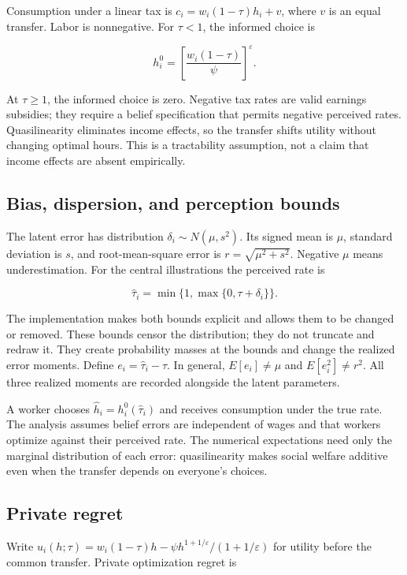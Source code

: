 \documentclass[
  11pt,
  letterpaper,
  DIV=11,
  numbers=noendperiod]{scrartcl}
\begin{document}
Consumption under a linear tax is \(c_i=w_i(1-\tau)h_i+v\), where \(v\)
is an equal transfer. Labor is nonnegative. For \(\tau<1\), the informed
choice is

\[h_i^0=\left[\frac{w_i(1-\tau)}{\psi}\right]^{\varepsilon}.\]

At \(\tau\geq1\), the informed choice is zero. Negative tax rates are
valid earnings subsidies; they require a belief specification that
permits negative perceived rates. Quasilinearity eliminates income
effects, so the transfer shifts utility without changing optimal hours.
This is a tractability assumption, not a claim that income effects are
absent empirically.

\subsection{Bias, dispersion, and perception
bounds}\label{bias-dispersion-and-perception-bounds}

The latent error has distribution \(\delta_i\sim N(\mu,s^2)\). Its
signed mean is \(\mu\), standard deviation is \(s\), and
root-mean-square error is \(r=\sqrt{\mu^2+s^2}\). Negative \(\mu\) means
underestimation. For the central illustrations the perceived rate is

\[\widehat\tau_i=\min\{1,\max\{0,\tau+\delta_i\}\}.\]

The implementation makes both bounds explicit and allows them to be
changed or removed. These bounds censor the distribution; they do not
truncate and redraw it. They create probability masses at the bounds and
change the realized error moments. Define \(e_i=\widehat\tau_i-\tau\).
In general, \(E[e_i]\ne\mu\) and \(E[e_i^2]\ne r^2\). All three realized
moments are recorded alongside the latent parameters.

A worker chooses \(\widehat h_i=h_i^0(\widehat\tau_i)\) and receives
consumption under the true rate. The analysis assumes belief errors are
independent of wages and that workers optimize against their perceived
rate. The numerical expectations need only the marginal distribution of
each error: quasilinearity makes social welfare additive even when the
transfer depends on everyone's choices.

\subsection{Private regret}\label{private-regret}

Write
\(u_i(h;\tau)=w_i(1-\tau)h-\psi h^{1+1/\varepsilon}/(1+1/\varepsilon)\)
for utility before the common transfer. Private optimization regret is
\end{document}

